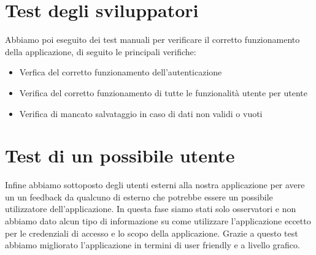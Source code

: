 \documentclass{report}
\begin{document}
\section{Test degli sviluppatori}
Abbiamo poi eseguito dei test manuali per verificare il corretto funzionamento della applicazione,
di seguito le principali verifiche:
\begin{itemize}
    \item Verfica del corretto funzionamento dell'autenticazione
    \item Verifica del corretto funzionamento di tutte le funzionalità utente per utente
    \item Verifica di mancato salvataggio in caso di dati non validi o vuoti
\end{itemize}

\section{Test di un possibile utente}
Infine abbiamo sottoposto degli utenti esterni alla nostra applicazione per avere un
un feedback da qualcuno di esterno che potrebbe essere un possibile utilizzatore
dell'applicazione.
In questa fase siamo stati solo osservatori e non abbiamo dato alcun tipo di informazione
su come utilizzare l'applicazione eccetto per le credenziali di accesso e lo scopo
della applicazione.
Grazie a questo test abbiamo migliorato l'applicazione in termini di user friendly
e a livello grafico.
\end{document}
